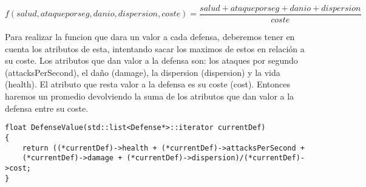 $$ f(salud,ataqueporseg,danio,dispersion,coste)= \frac{{salud}+{ataqueporseg}+{danio}+{dispersion}}{coste} $$

Para realizar la funcion que dara un valor a cada defensa, deberemos tener en cuenta los atributos de esta, intentando sacar los maximos de estos en relación a su coste.
Los atributos que dan valor a la defensa son: los ataques por segundo (attacksPerSecond), el daño (damage), la dispersion (dispersion) y la vida (health).
El atributo que resta valor a la defensa es su coste (cost).
Entonces haremos un promedio devolviendo la suma de los atributos que dan valor a la defensa entre su coste.

\begin{lstlisting}[frame=single,basicstyle=\tiny,title={Funcion DefenseValue}]
float DefenseValue(std::list<Defense*>::iterator currentDef)
{
	return ((*currentDef)->health + (*currentDef)->attacksPerSecond + 
	(*currentDef)->damage + (*currentDef)->dispersion)/(*currentDef)->cost;
}
\end{lstlisting}
